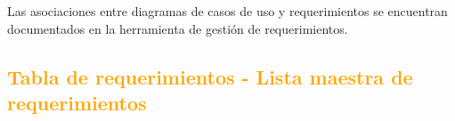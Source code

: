 Las asociaciones entre diagramas de casos de uso y requerimientos se encuentran
documentados en la herramienta de gestión de requerimientos. 


\newpage
\subsection{\textcolor{orange}{Tabla de requerimientos - Lista maestra de
requerimientos}} 
